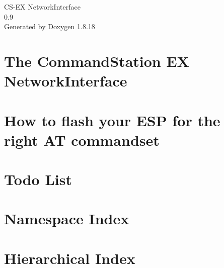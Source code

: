 \let\mypdfximage\pdfximage\def\pdfximage{\immediate\mypdfximage}\documentclass[twoside]{book}
\newcommand{\+}{\discretionary{\mbox{\scriptsize$\hookleftarrow$}}{}{}}
\newcommand{\clearemptydoublepage}{%
  \newpage{\pagestyle{empty}\cleardoublepage}%
}
\begin{document}
\hypersetup{pageanchor=false,
             bookmarksnumbered=true,
             pdfencoding=unicode
            }
\begin{titlepage}
\vspace*{7cm}
\begin{center}%
{\Large C\+S-\/\+EX Network\+Interface \\[1ex]\large 0.\+9 }\\
\vspace*{1cm}
{\large Generated by Doxygen 1.8.18}\\
\end{center}
\end{titlepage}
\clearemptydoublepage
{}
\tableofcontents
\clearemptydoublepage
{}
\hypersetup{pageanchor=true}

\chapter{The Command\+Station EX Network\+Interface}
\label{md___users_gregor__documents__platform_i_o__projects__ethernet_interface_src_docs__c_s_network_interface}

\chapter{How to flash your E\+SP for the right AT commandset}
\label{md___users_gregor__documents__platform_i_o__projects__ethernet_interface_src_docs__flash_your__e_s_p_with__a_t_1_87_commandset}

\chapter{Todo List}
\label{todo}

\chapter{Namespace Index}

\chapter{Hierarchical Index}

\end{document}
